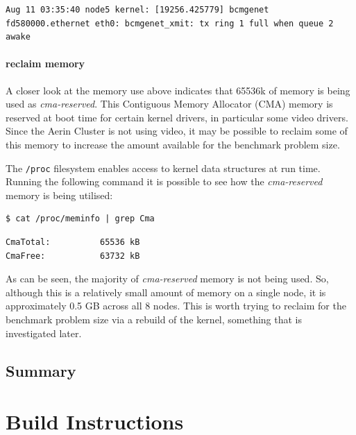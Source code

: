\documentclass{report}
\begin{document}
\lstset{style=type}
\begin{lstlisting}
Aug 11 03:35:40 node5 kernel: [19256.425779] bcmgenet fd580000.ethernet eth0: bcmgenet_xmit: tx ring 1 full when queue 2 awake
\end{lstlisting}



%
%
\subsection{reclaim memory}
A closer look at the memory use above indicates that 65536k of memory is being used as \emph{cma-reserved}. This Contiguous Memory Allocator (CMA) memory is reserved at boot time for certain kernel drivers, in particular some video drivers. Since the Aerin Cluster is not using video, it may be possible to reclaim some of this memory to increase the amount available for the benchmark problem size.

The \verb|/proc| filesystem enables access to kernel data structures at run time. Running the following command it is possible to see how the \emph{cma-reserved} memory is being utilised:

\lstset{style=type}
\begin{lstlisting}
$ cat /proc/meminfo | grep Cma
\end{lstlisting}

\lstset{style=type}
\begin{lstlisting}
CmaTotal:          65536 kB
CmaFree:           63732 kB
\end{lstlisting}

As can be seen, the majority of \emph{cma-reserved} memory is not being used. So, although this is a relatively small amount of memory on a single node, it is approximately 0.5 GB across all 8 nodes. This is worth trying to reclaim for the benchmark problem size via a rebuild of the kernel, something that is investigated later.





%
%
\chapter{Summary}


%
%
\part{Build Instructions}

%
%
\end{document}
